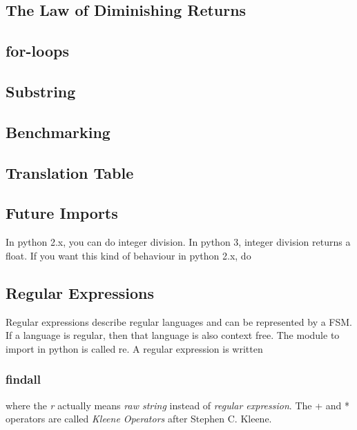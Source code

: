\documentclass[12pt]{article}
\begin{document}
\subsection{The Law of Diminishing Returns}

\subsection{for-loops}


\subsection{Substring}


\subsection{Benchmarking}


\subsection{Translation Table}


\subsection{Future Imports}

In python 2.x, you can do integer division. In python 3, integer division returns a float. If you want this kind of behaviour in python 2.x, do



\subsection{Regular Expressions}

Regular expressions describe regular languages and can be represented by a FSM.
If a language is regular, then that language is also context free.
The module to import in python is called re. A regular expression is written

\subsubsection{findall}


where the \emph{r} actually means \emph{raw string} instead of \emph{regular expression}. The + and * operators are called \emph{Kleene Operators} after Stephen C. Kleene.
\end{document}
